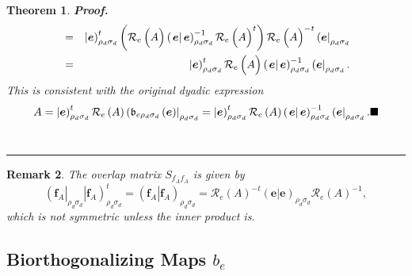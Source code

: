\documentclass[aps,preprint]{revtex4}
\newtheorem{theorem}{Theorem}
\newtheorem{remark}[theorem]{Remark}
\newenvironment{proof}[1][Proof]{\noindent\textbf{#1.} }{\ \rule{0.5em}{0.5em}}
\begin{document}
\begin{theorem}
\begin{proof}
\begin{eqnarray}
&=&\left\vert \overset{}{\boldsymbol{e}}\right) _{\rho _{d}\sigma
_{d}}^{t}\left( \mathcal{R}_{e}\left( \overset{}{A}\right) \left( \left. 
\overset{}{\boldsymbol{e}}\right\vert \boldsymbol{e}\right) _{\rho
_{d}\sigma _{d}}^{-1}\mathcal{R}_{e}\left( \overset{}{A}\right) ^{t}\right) 
\mathcal{R}_{e}\left( \overset{}{A}\right) ^{-t}\left( \overset{}{%
\boldsymbol{e}}\right\vert _{\rho _{d}\sigma _{d}} \\
&=&\left\vert \overset{}{\boldsymbol{e}}\right) _{\rho _{d}\sigma _{d}}^{t}%
\mathcal{R}_{e}\left( \overset{}{A}\right) \left( \left. \overset{}{%
\boldsymbol{e}}\right\vert \boldsymbol{e}\right) _{\rho _{d}\sigma
_{d}}^{-1}\left( \overset{}{\boldsymbol{e}}\right\vert _{\rho _{d}\sigma
_{d}}.
\end{eqnarray}%
This is consistent with the original dyadic expression 
\begin{equation}
A=\left\vert \overset{}{\boldsymbol{e}}\right) _{\rho _{d}\sigma _{d}}^{t}%
\mathcal{R}_{e}\left( A\right) \left( \mathfrak{b}_{e\rho _{d}\sigma
_{d}}\left( \overset{}{\boldsymbol{e}}\right) \right\vert _{\rho _{d}\sigma
_{d}}=\left\vert \overset{}{\boldsymbol{e}}\right) _{\rho _{d}\sigma
_{d}}^{t}\mathcal{R}_{e}\left( A\right) \left( \left. \overset{}{\boldsymbol{%
e}}\right\vert \boldsymbol{e}\right) _{\rho _{d}\sigma _{d}}^{-1}\left( 
\overset{}{\boldsymbol{e}}\right\vert _{\rho _{d}\sigma _{d}}.\blacksquare
\end{equation}
\end{proof}
\end{theorem}

\begin{remark}
The overlap matrix $S_{f_{A}f_{A}}$ is given by 
\begin{equation}
\left( \overset{}{\boldsymbol{f}_{A}}\right\vert _{\rho _{d}\sigma
_{d}}\left\vert \overset{}{\boldsymbol{f}_{A}}\right) _{\rho _{d}\sigma
_{d}}^{t}=\left( \left. \overset{}{\boldsymbol{f}_{A}}\right\vert 
\boldsymbol{f}_{A}\right) _{\rho _{d}\sigma _{d}}=\mathcal{R}_{e}\left(
A\right) ^{-t}\left( \left. \overset{}{\boldsymbol{e}}\right\vert 
\boldsymbol{e}\right) _{\rho _{d}\sigma _{d}}\mathcal{R}_{e}\left( A\right)
^{-1},
\end{equation}%
which is not symmetric unless the inner product is.
\end{remark}

\subsection{Biorthogonalizing Maps $b_{e}$ \label{Biorthogonalizing Maps}}
\end{document}
